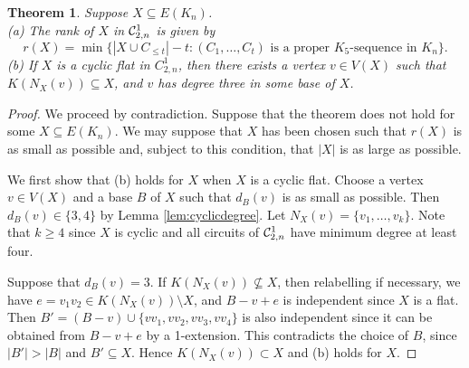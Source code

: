 \documentclass{daj}
\newtheorem{theorem}[thm]{Theorem}\theoremstyle{plain}
\begin{document}
 \begin{theorem}\label{thm:rank}
Suppose $X\subseteq E(K_n)$.\\  (a) The rank of $X$ in 
${\cal C}_{2,n}^1$ is given by
\[
r(X)=\min \{|X\cup C_{\leq t}|-t : \text{$(C_1,\dots, C_t)$ is a proper $K_{5}$-sequence in $K_n$} \}.
\]
(b) If $X$ is a cyclic flat in $C_{2,n}^1$, then there exists a vertex $v\in V(X)$ such that  $K(N_X(v))\subseteq X$, and $v$ has degree three in some base of $X$.
\end{theorem}
\begin{proof}
We proceed by contradiction. Suppose that the theorem does not hold for some $X\subseteq E(K_n)$. We may suppose that $X$ has been chosen such that $r(X)$ is as small as possible and, subject to this condition, that $|X|$ is as large as possible. 




We first show that (b) holds for $X$ when $X$ is a cyclic flat. Choose a vertex $v\in V(X)$ and a base $B$   of $X$ such that $d_B(v)$ is as small as possible. Then $d_B(v)\in\{3,4\}$  by Lemma \ref{lem:cyclicdegree}.
Let $N_X(v)=\{v_1,\dots, v_k\}$. Note that $k\geq 4$ since $X$ is cyclic and all circuits of ${\cal C}_{2,n}^1$ have minimum degree at least four.

Suppose that $d_B(v)= 3$.
If $K(N_X(v))\not\subseteq X$, then relabelling if necessary, we have $e=v_1v_2\in K(N_X(v))\setminus X$, and  $B-v+e$ is independent since $X$ is a flat.  Then
$B'=(B-v)\cup \{vv_1,vv_2,vv_3,vv_4\}$ is also independent
 since it can be obtained from $B-v+e$ by a 1-extension.
This contradicts the choice of $B$, since $|B'|>|B|$ and $B'\subseteq X$. Hence  $K(N_X(v))\subset X$ and (b) holds for $X$.


\end{proof}
\end{document}
